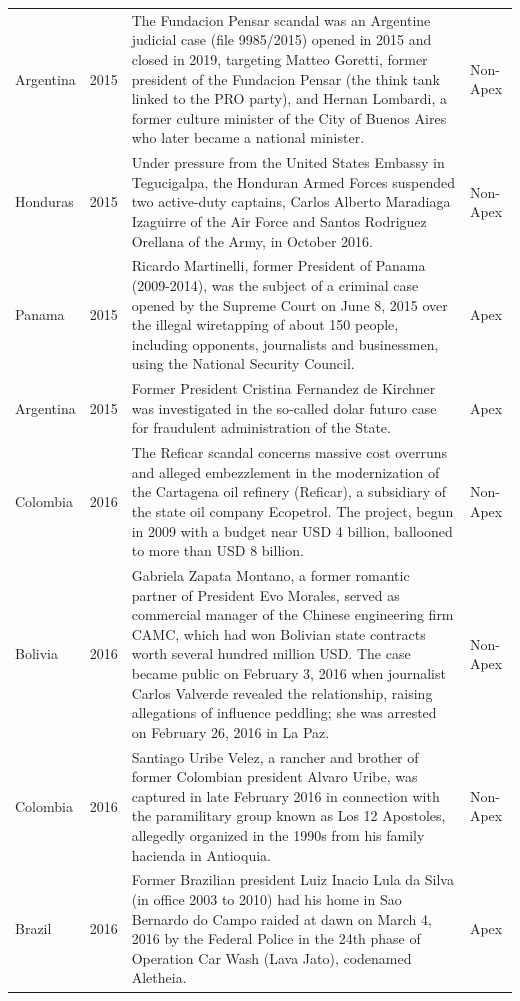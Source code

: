 \begin{landscape}
\begin{longtable}{@{}l c p{15.5cm} l@{}}
Argentina & 2015 & The Fundacion Pensar scandal was an Argentine judicial case (file 9985/2015) opened in 2015 and closed in 2019, targeting Matteo Goretti, former president of the Fundacion Pensar (the think tank linked to the PRO party), and Hernan Lombardi, a former culture minister of the City of Buenos Aires who later became a national minister. & Non-Apex \\
Honduras & 2015 & Under pressure from the United States Embassy in Tegucigalpa, the Honduran Armed Forces suspended two active-duty captains, Carlos Alberto Maradiaga Izaguirre of the Air Force and Santos Rodriguez Orellana of the Army, in October 2016. & Non-Apex \\
Panama & 2015 & Ricardo Martinelli, former President of Panama (2009-2014), was the subject of a criminal case opened by the Supreme Court on June 8, 2015 over the illegal wiretapping of about 150 people, including opponents, journalists and businessmen, using the National Security Council. & Apex \\
Argentina & 2015 & Former President Cristina Fernandez de Kirchner was investigated in the so-called dolar futuro case for fraudulent administration of the State. & Apex \\
Colombia & 2016 & The Reficar scandal concerns massive cost overruns and alleged embezzlement in the modernization of the Cartagena oil refinery (Reficar), a subsidiary of the state oil company Ecopetrol. The project, begun in 2009 with a budget near USD 4 billion, ballooned to more than USD 8 billion. & Non-Apex \\
Bolivia & 2016 & Gabriela Zapata Montano, a former romantic partner of President Evo Morales, served as commercial manager of the Chinese engineering firm CAMC, which had won Bolivian state contracts worth several hundred million USD. The case became public on February 3, 2016 when journalist Carlos Valverde revealed the relationship, raising allegations of influence peddling; she was arrested on February 26, 2016 in La Paz. & Non-Apex \\
Colombia & 2016 & Santiago Uribe Velez, a rancher and brother of former Colombian president Alvaro Uribe, was captured in late February 2016 in connection with the paramilitary group known as Los 12 Apostoles, allegedly organized in the 1990s from his family hacienda in Antioquia. & Non-Apex \\
Brazil & 2016 & Former Brazilian president Luiz Inacio Lula da Silva (in office 2003 to 2010) had his home in Sao Bernardo do Campo raided at dawn on March 4, 2016 by the Federal Police in the 24th phase of Operation Car Wash (Lava Jato), codenamed Aletheia. & Apex \\

\end{longtable}
\end{landscape}
